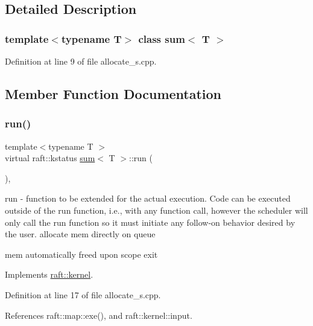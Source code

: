 \subsection{Detailed Description}
\subsubsection*{template$<$typename T$>$\newline
class sum$<$ T $>$}



Definition at line 9 of file allocate\+\_\+s.\+cpp.



\subsection{Member Function Documentation}
\hypertarget{classsum_a2d0fac9129b826678d00520621937b15}{}\label{classsum_a2d0fac9129b826678d00520621937b15} 
\subsubsection{\texorpdfstring{run()}{run()}}
{\footnotesize\ttfamily template$<$typename T $>$ \\
virtual raft\+::kstatus \hyperlink{classsum}{sum}$<$ T $>$\+::run (\begin{DoxyParamCaption}{ }\end{DoxyParamCaption})\hspace{0.3cm}{\ttfamily [inline]}, {\ttfamily [virtual]}}

run -\/ function to be extended for the actual execution. Code can be executed outside of the run function, i.\+e., with any function call, however the scheduler will only call the run function so it must initiate any follow-\/on behavior desired by the user. allocate mem directly on queue

mem automatically freed upon scope exit 

Implements \hyperlink{classraft_1_1kernel_a05094286d7577360fb1b91c91fc05901}{raft\+::kernel}.



Definition at line 17 of file allocate\+\_\+s.\+cpp.



References raft\+::map\+::exe(), and raft\+::kernel\+::input.


